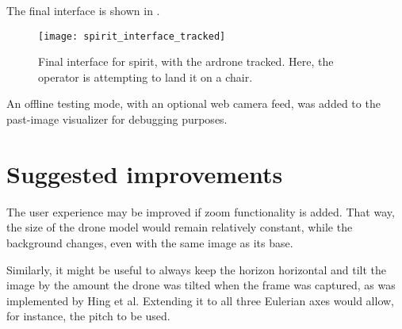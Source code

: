     The final interface is shown in .

    \begin{figure}[h]
      \centering
      \texttt{[image: spirit\_interface\_tracked]}
      \caption[SPIRIT final interface]{Final interface for \gls{spirit}, with the \gls{ardrone} tracked. Here, the operator is attempting to land it on a chair.}
      \label{fig:spirit_interface_tracked}
    \end{figure}
    
    An offline testing mode, with an optional web camera feed, was added to the past-image visualizer for debugging purposes.


  \section{Suggested improvements}
    The user experience may be improved if zoom functionality is added.
    That way, the size of the drone model would remain relatively constant, while the background changes, even with the same image as its base.
    
    Similarly, it might be useful to always keep the horizon horizontal and tilt the image by the amount the drone was tilted when the frame was captured, as was implemented by Hing et al.\cite{hing2009}
    Extending it to all three Eulerian axes would allow, for instance, the pitch to be used.
